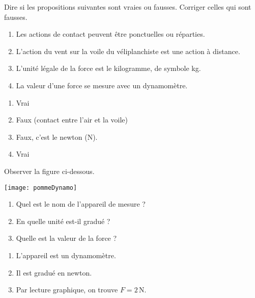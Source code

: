 \begin{exercice}
Dire si les propositions suivantes sont vraies ou fausses. Corriger celles qui sont fausses.
\begin{enumerate}
\item Les actions de contact peuvent être ponctuelles ou réparties.
\item L'action du vent sur la voile du véliplanchiste est une action à distance.
\item L'unité légale de la force est le kilogramme, de symbole kg.
\item La valeur d’une force se mesure avec un dynamomètre.
\end{enumerate}
\end{exercice}


\begin{corrige}
\begin{enumerate}
\item Vrai 
\item Faux (contact entre l'air et la voile)
\item Faux, c'est le newton (N).
\item Vrai
\end{enumerate}
\end{corrige}








\begin{exercice}
Observer la figure ci-dessous.

\begin{minipage}[c]{.28\linewidth}
\centering
\texttt{[image: pommeDynamo]}
\end{minipage}\hfill%
\begin{minipage}[c]{.68\linewidth}
\begin{enumerate}
\item Quel est le nom de l'appareil de mesure ?
\item En quelle unité est-il gradué ?
\item Quelle est la valeur de la force ? 
\end{enumerate}
\end{minipage}
\end{exercice}


\begin{corrige}
\begin{enumerate}
\item L'appareil est un dynamomètre.
\item Il est gradué en newton.
\item Par lecture graphique, on trouve $F=2$\,N. 
\end{enumerate}
\end{corrige}








